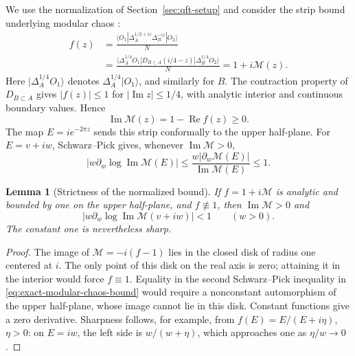 \documentclass[a4paper,11pt]{article}
\newtheorem{lemma}[theorem]{Lemma}
\theoremstyle{definition}
\begin{document}
We use the normalization of Section~\ref{sec:qft-setup} and consider the strip bound underlying modular chaos \cite{deBoerLamprou2020}:
\begin{align}
 f(z)&=\frac{\langle O_1|\Delta_A^{1/2+iz}\Delta_B^{-iz}|O_2\rangle}{N}
 \nonumber\\
 &=\frac{\langle\Delta_A^{1/4}O_1|
          D_{B\subset A}(i/4-z)|\Delta_B^{1/4}O_2\rangle}{N}
 =1+i\mathcal M(z).
 \label{eq:normalized-characteristic}
\end{align}
Here $|\Delta_A^{1/4}O_1\rangle$ denotes $\Delta_A^{1/4}|O_1\rangle$, and similarly for $B$. The contraction property of $D_{B\subset A}$ gives $|f(z)|\leq1$ for $|\operatorname{Im}z|\leq1/4$, with analytic interior and continuous boundary values. Hence
\begin{equation}
 \operatorname{Im}\mathcal M(z)=1-\operatorname{Re}f(z)\geq0.
 \label{eq:positive-imaginary-part}
\end{equation}
The map $E=ie^{-2\pi z}$ sends this strip conformally to the upper half-plane. For $E=v+iw$, Schwarz--Pick gives, whenever $\operatorname{Im}\mathcal M>0$,
\begin{equation}
 \left|w\partial_w\log\operatorname{Im}\mathcal M(E)\right|
 \leq\frac{w|\partial_w\mathcal M(E)|}{\operatorname{Im}\mathcal M(E)}
 \leq1.
 \label{eq:exact-modular-chaos-bound}
\end{equation}

\begin{lemma}[Strictness of the normalized bound]
\label{lem:strict-modular-chaos-bound}
If $f=1+i\mathcal M$ is analytic and bounded by one on the upper half-plane, and $f\not\equiv1$, then $\operatorname{Im}\mathcal M>0$ and
\begin{equation}
 \left|w\partial_w\log\operatorname{Im}\mathcal M(v+iw)\right|<1
 \qquad(w>0).
 \label{eq:strict-modular-chaos-bound}
\end{equation}
The constant one is nevertheless sharp.
\end{lemma}
\begin{proof}
The image of $\mathcal M=-i(f-1)$ lies in the closed disk of radius one centered at $i$. The only point of this disk on the real axis is zero; attaining it in the interior would force $f\equiv1$. Equality in the second Schwarz--Pick inequality in \eqref{eq:exact-modular-chaos-bound} would require a nonconstant automorphism of the upper half-plane, whose image cannot lie in this disk. Constant functions give a zero derivative. Sharpness follows, for example, from $f(E)=E/(E+i\eta)$, $\eta>0$: on $E=iw$, the left side is $w/(w+\eta)$, which approaches one as $\eta/w\to0$.
\end{proof}
\end{document}

